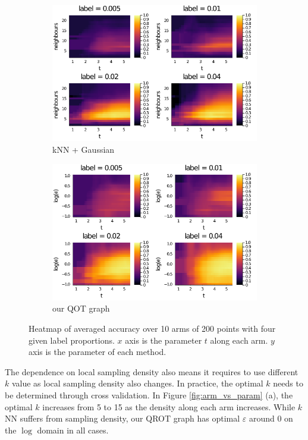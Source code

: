 \documentclass{article}
\begin{document}
\begin{figure}[H]
    \centering
    \begin{subfigure}{0.45\textwidth}
    \includegraphics[width=\textwidth]{LaTeX/figures/KNN_unf4.png}
    \caption{kNN + Gaussian}
    \end{subfigure}
    \begin{subfigure}{0.45\textwidth}
    \includegraphics[width=\textwidth]{LaTeX/figures/QOT_unf4.png}
    \caption{our QOT graph}
    \end{subfigure}
    \caption{Heatmap of averaged accuracy over 10 arms of 200 points with four given label proportions. $x$ axis is the parameter $t$ along each arm. $y$ axis is the parameter of each method. }
    \label{fig:t_vs_param}
\end{figure}

The dependence on local sampling density also means it requires to use different $k$ value as local sampling density also changes. 
In practice, the optimal $k$ needs to be determined through cross validation.
In Figure \ref{fig:arm_vs_param} (a), the optimal $k$ increases from 5 to 15 as the density along each arm increases.
While $k$NN suffers from sampling density, our QROT graph has optimal $\varepsilon$ around 0 on the $\log$ domain in all cases. 
\end{document}
